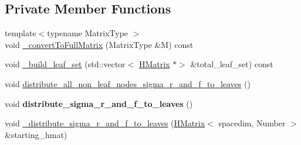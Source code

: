 \subsection*{Private Member Functions}
\begin{DoxyCompactItemize}
\item 
{\footnotesize template$<$typename Matrix\+Type $>$ }\\void \hyperlink{classHMatrix_ab55b568236ffdd71b5378ac6c6ace50a}{\+\_\+convert\+To\+Full\+Matrix} (Matrix\+Type \&M) const
\item 
void \hyperlink{classHMatrix_a60934e84cc3c9f6c75d011a2005f512a}{\+\_\+build\+\_\+leaf\+\_\+set} (std\+::vector$<$ \hyperlink{classHMatrix}{H\+Matrix} $\ast$$>$ \&total\+\_\+leaf\+\_\+set) const
\item 
void \hyperlink{classHMatrix_a01360c3d9a93154f2e629b6c413aa991}{distribute\+\_\+all\+\_\+non\+\_\+leaf\+\_\+nodes\+\_\+sigma\+\_\+r\+\_\+and\+\_\+f\+\_\+to\+\_\+leaves} ()
\item 
\mbox{\label{classHMatrix_a963ad3e2c76ba7034b5057fef03254e1}} 
void {\bfseries distribute\+\_\+sigma\+\_\+r\+\_\+and\+\_\+f\+\_\+to\+\_\+leaves} ()
\item 
void \hyperlink{classHMatrix_a2229caab9b862f9c54b7f3a806125fba}{\+\_\+distribute\+\_\+sigma\+\_\+r\+\_\+and\+\_\+f\+\_\+to\+\_\+leaves} (\hyperlink{classHMatrix}{H\+Matrix}$<$ spacedim, Number $>$ \&starting\+\_\+hmat)
\end{DoxyCompactItemize}
